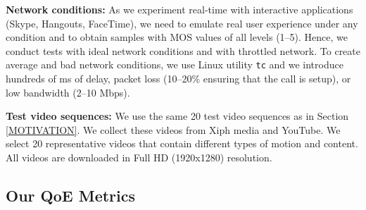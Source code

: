 \noindent \textbf{Network conditions:} As we experiment real-time with interactive applications (Skype, Hangouts, FaceTime), we need to emulate real user experience under any condition and to obtain samples with MOS values of all levels (1--5). Hence, we conduct tests with ideal network conditions and with throttled network. To create average and bad network conditions, we use Linux utility \texttt{tc} and we introduce hundreds of ms of delay, packet loss (10--20\% ensuring that the call is setup), or low bandwidth (2--10 Mbps).  

\noindent \textbf{Test video sequences:} We use the same 20 test video sequences as in Section \ref{MOTIVATION}. 
We collect these videos  from Xiph media \cite{xiph2008org} and YouTube. We select 20 representative videos that contain different types of motion and content.
All videos are downloaded in Full HD (1920x1280) resolution.

\subsection{Our QoE Metrics}

